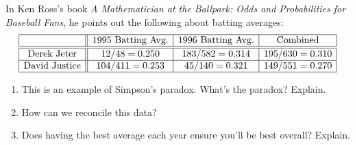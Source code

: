 \documentclass[nooutcomes,noauthor,hints,handout]{ximera}
\begin{document}
\begin{question}
In Ken Ross's book \textit{A Mathematician at the Ballpark: Odds and Probabilities for Baseball Fans}, he points out the following about batting averages:
\[
\begin{array}{|c||c|c|c|} \hline
 & 1995~\text{Batting Avg.} & 1996~\text{Batting Avg.}& \text{Combined}\\ \hline\hline
\text{Derek Jeter} & 12/48 = 0.250 & 183/582 = 0.314 & 195/630 =0.310\\ \hline
\text{David Justice} & 104/411=0.253 & 45/140=0.321  & 149/551 = 0.270\\ \hline
\end{array}
\]
\begin{enumerate}
\item This is an example of Simpson's paradox. What's the paradox? Explain.
\item How can we reconcile this data?
\item Does having the best average each year ensure you'll be best overall? Explain.
\end{enumerate}
\end{question}
\mynewpage
\end{document}
